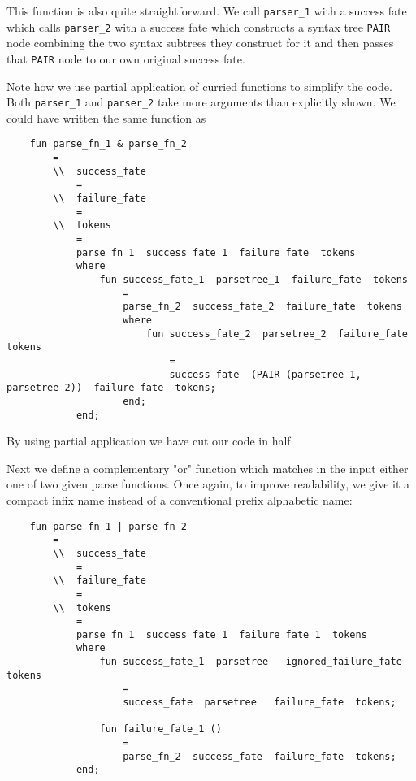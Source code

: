 This function is also quite straightforward.  We call 
{\tt parser\_1} with a success fate 
which calls {\tt parser\_2} 
with a success fate which constructs a syntax tree 
{\tt PAIR} node combining the two syntax subtrees they 
construct for it and then passes that {\tt PAIR} 
node to our own original success fate.

Note how we use partial application of curried functions 
to simplify the code.  Both {\tt parser\_1} and {\tt parser\_2} 
take more arguments than explicitly shown.  We could have 
written the same function as

\begin{verbatim}
    fun parse_fn_1 & parse_fn_2
        =
        \\  success_fate
            =
        \\  failure_fate
            =
        \\  tokens
            =
            parse_fn_1  success_fate_1  failure_fate  tokens
            where
                fun success_fate_1  parsetree_1  failure_fate  tokens
                    =
                    parse_fn_2  success_fate_2  failure_fate  tokens
                    where
                        fun success_fate_2  parsetree_2  failure_fate  tokens
                            =
                            success_fate  (PAIR (parsetree_1, parsetree_2))  failure_fate  tokens;
                    end;
            end;
\end{verbatim}

By using partial application we have cut our code in half.

Next we define a complementary "or" function which matches in the 
input either one of two given parse functions.  Once again, to 
improve readability, we give it a compact infix name instead of 
a conventional prefix alphabetic name:

\begin{verbatim}
    fun parse_fn_1 | parse_fn_2
        =
        \\  success_fate
            =
        \\  failure_fate
            =
        \\  tokens
            =
            parse_fn_1  success_fate_1  failure_fate_1  tokens
            where
                fun success_fate_1  parsetree   ignored_failure_fate  tokens
                    =
                    success_fate  parsetree   failure_fate  tokens;

                fun failure_fate_1 ()
                    =
                    parse_fn_2  success_fate  failure_fate  tokens;
            end;
\end{verbatim}

